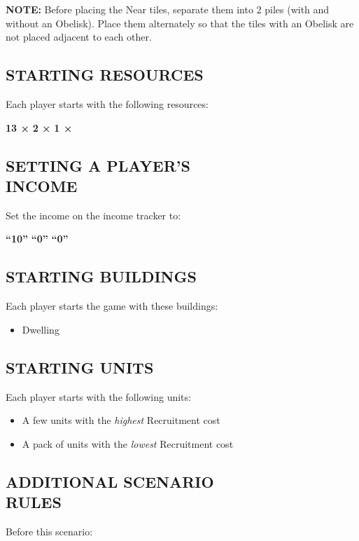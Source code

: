 \begin{multicols*}{2}
\textbf{\MakeUppercase{Note:}} Before placing the Near tiles, separate them into 2 piles (with and without an Obelisk). Place them alternately so that the tiles with an Obelisk are not placed adjacent to each other.

\subsection*{\MakeUppercase{Starting Resources}}
Each player starts with the following resources:

{\centering\hfill \textbf{13 ×}  \hfill \textbf{2 ×}  \hfill \textbf{1 ×} \hfill}

\subsection*{\MakeUppercase{Setting a Player's\\Income}}
Set the income on the income tracker to:

{\centering\hfill\textbf{``10''}  \hfill \textbf{``0''}  \hfill \textbf{``0''} \hfill}

\subsection*{\MakeUppercase{Starting Buildings}}
Each player starts the game with these buildings:

\begin{itemize}
    \item {} Dwelling
\end{itemize}

\subsection*{\MakeUppercase{Starting Units}}
Each player starts with the following units:

\begin{itemize}
    \item A few  units with the \textit{highest} Recruitment cost
    \item A pack of  units with the \textit{lowest} Recruitment cost
\end{itemize}

\subsection*{\MakeUppercase{Additional Scenario\\Rules}}
Before this scenario:


\end{multicols*}
